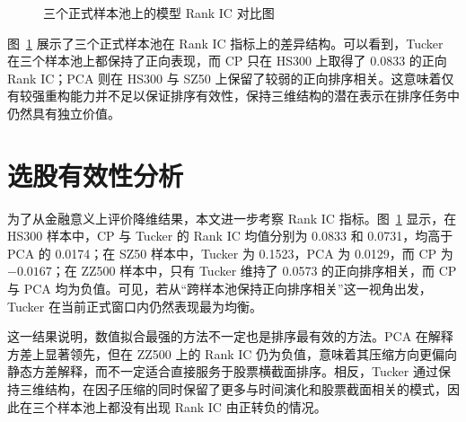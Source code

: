 \begin{figure}[!t]
\centering
{}
\caption{三个正式样本池上的模型 Rank IC 对比图}
\label{fig:rankic}
\end{figure}

图~\ref{fig:rankic} 展示了三个正式样本池在 Rank IC 指标上的差异结构。可以看到，Tucker 在三个样本池上都保持了正向表现，而 CP 只在 HS300 上取得了 0.0833 的正向 Rank IC；PCA 则在 HS300 与 SZ50 上保留了较弱的正向排序相关。这意味着仅有较强重构能力并不足以保证排序有效性，保持三维结构的潜在表示在排序任务中仍然具有独立价值。

\section{选股有效性分析}

为了从金融意义上评价降维结果，本文进一步考察 Rank IC 指标。图~\ref{fig:rankic} 显示，在 HS300 样本中，CP 与 Tucker 的 Rank IC 均值分别为 0.0833 和 0.0731，均高于 PCA 的 0.0174；在 SZ50 样本中，Tucker 为 0.1523，PCA 为 0.0129，而 CP 为 $-0.0167$；在 ZZ500 样本中，只有 Tucker 维持了 0.0573 的正向排序相关，而 CP 与 PCA 均为负值。可见，若从“跨样本池保持正向排序相关”这一视角出发，Tucker 在当前正式窗口内仍然表现最为均衡。

这一结果说明，数值拟合最强的方法不一定也是排序最有效的方法。PCA 在解释方差上显著领先，但在 ZZ500 上的 Rank IC 仍为负值，意味着其压缩方向更偏向静态方差解释，而不一定适合直接服务于股票横截面排序。相反，Tucker 通过保持三维结构，在因子压缩的同时保留了更多与时间演化和股票截面相关的模式，因此在三个样本池上都没有出现 Rank IC 由正转负的情况。

